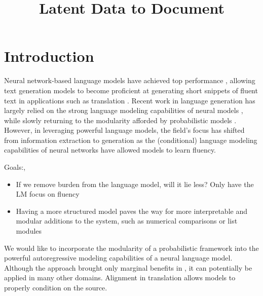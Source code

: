 \documentclass{article}
\title{Latent Data to Document}
\begin{document}
\maketitle

\section{Introduction}
\begin{comment}
Story:
In the early 2000's we had modular probabilistic models,
but the focus was on information extraction and alignment.
Now that we have powerful language models and classification methods,
the focus has instead shifted to text generation.
However the shift towards language modeling has de-emphasized the role of
modularity in modeling and resulted in largel black-box models with little structure. 
\end{comment}

Neural network-based language models have achieved top performance \citep{yang2017moslm},
allowing text generation models to become proficient at
generating short snippets of fluent text in applications such as translation \citep{bahdanau2014mt}.
Recent work in language generation has largely relied on the strong language modeling capabilities
of neural models \citep{wiseman2017d2t},
while slowly returning to the modularity afforded by probabilistic models \citep{wiseman2018template,
deng2018vattn}.
However, in leveraging powerful language models,
the field's focus has shifted from information extraction to generation as the (conditional)
language modeling capabilities of neural networks have allowed models to learn fluency.

Goals:\citet{wiseman2017d2t}, \citep{liang2009semalign}
\begin{itemize}
\item If we remove burden from the language model, will it lie less?
Only have the LM focus on fluency
\item Having a more structured model paves the way for more interpretable and
modular additions to the system, such as numerical comparisons or list modules
\end{itemize}


We would like to incorporate the modularity of a probabilistic framework into the powerful 
autoregressive modeling capabilities of a neural language model.
Although the approach brought only marginal benefits in \citet{deng2018vattn},
it can potentially be applied in many other domains. 
Alignment in translation allows models to properly condition on the source.
\end{document}
